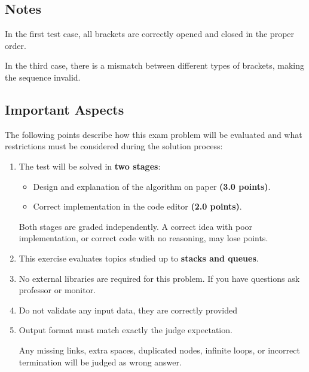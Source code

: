 \documentclass[11pt,a4paper]{article}
\begin{document}
\subsection*{Notes}

In the first test case, all brackets are correctly opened and closed in the proper order.

In the third case, there is a mismatch between different types of brackets, making the sequence invalid.

\subsection*{Important Aspects}

The following points describe how this exam problem will be evaluated and what restrictions must be considered during the solution process:

\begin{enumerate}

\item The test will be solved in \textbf{two stages}:

\begin{itemize}
    \item Design and explanation of the algorithm on paper \textbf{(3.0 points)}.
    \item Correct implementation in the code editor \textbf{(2.0 points)}.
\end{itemize}

Both stages are graded independently. A correct idea with poor implementation, or correct code with no reasoning, may lose points.

\item This exercise evaluates topics studied up to \textbf{stacks and queues}.

\item No external libraries are required for this problem. If you have questions ask professor or monitor. 

\item Do not validate any input data, they are correctly provided

\item Output format must match exactly the judge expectation.

Any missing links, extra spaces, duplicated nodes, infinite loops, or incorrect termination will be judged as wrong answer.

\end{enumerate}
\end{document}
